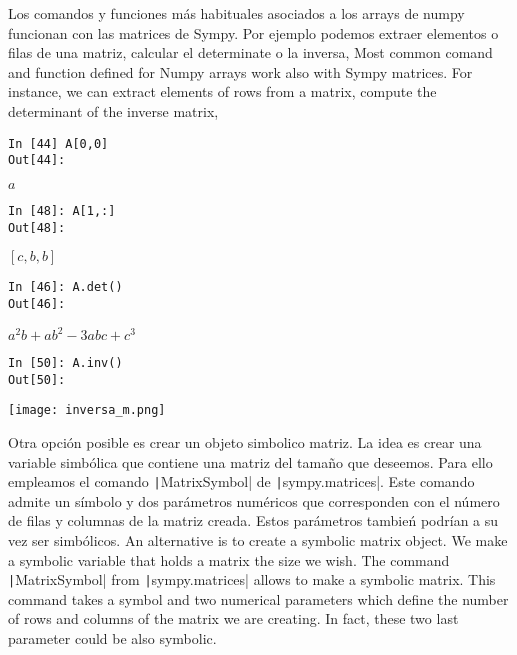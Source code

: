\begin{paracol}{2}
Los comandos y funciones más habituales asociados a los arrays de numpy funcionan con las matrices de Sympy. Por ejemplo podemos extraer elementos o filas de una matriz, calcular el determinate o la inversa,
\switchcolumn
Most common comand and function defined for Numpy arrays work also with Sympy matrices. For instance, we can extract elements of rows from a matrix, compute the determinant of the inverse matrix, 
\end{paracol}
\begin{center}
	\begin{minipage}{.5\textwidth}
		\begin{verbatim}
In [44] A[0,0]
Out[44]: 
\end{verbatim}
$a$	 				
\begin{verbatim}
In [48]: A[1,:]
Out[48]:
\end{verbatim}
$[c,b,b]$
\begin{verbatim}
In [46]: A.det()
Out[46]: 
\end{verbatim}
$a^2b+ab^2-3abc+c^3$
\end{minipage}
\end{center}
\begin{center}
	\begin{minipage}{.5\textwidth}

\begin{verbatim}
In [50]: A.inv()
Out[50]: 
\end{verbatim}
\texttt{[image: inversa\_m.png]}
	\end{minipage}
\end{center}
\begin{paracol}{2}
Otra opción posible es crear un objeto simbolico matriz. La idea es crear una variable simbólica que contiene una matriz del tamaño que deseemos. Para ello empleamos el comando \texttt|MatrixSymbol| de  \texttt|sympy.matrices|. Este comando admite un símbolo y dos parámetros numéricos que corresponden con el número de filas y columnas de la matriz creada. Estos parámetros tambień podrían a su vez ser simbólicos.
\switchcolumn
An alternative is to create a symbolic matrix object. We make a symbolic variable that holds a matrix the size we wish. The command \texttt|MatrixSymbol| from \texttt|sympy.matrices| allows to make a symbolic matrix. This command takes a symbol and two numerical parameters which define the number of rows and columns of the matrix we are creating. In fact, these two last parameter could be also symbolic.
\end{paracol}
